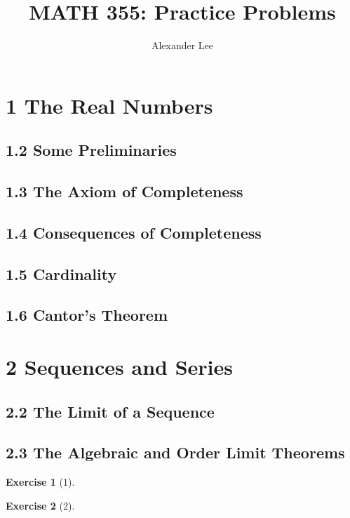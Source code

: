 \documentclass{amsart}
\title{MATH 355: Practice Problems}
\author{Alexander Lee}
\theoremstyle{definition}
\newtheorem*{exercise}{Exercise}
\begin{document}
\maketitle

\section*{1 The Real Numbers}

\subsection*{1.2 Some Preliminaries}

\subsection*{1.3 The Axiom of Completeness}

\subsection*{1.4 Consequences of Completeness}

\subsection*{1.5 Cardinality}

\subsection*{1.6 Cantor's Theorem}

\section*{2 Sequences and Series}

\subsection*{2.2 The Limit of a Sequence}

\subsection*{2.3 The Algebraic and Order Limit Theorems}

\begin{exercise}[1]
\end{exercise}

\begin{exercise}[2]
\end{exercise}
\end{document}
